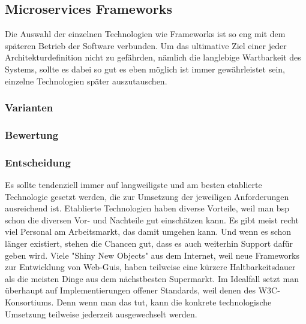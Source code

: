 \subsection{Microservices Frameworks}
\label{sec:frameworks}
Die Auswahl der einzelnen Technologien wie Frameworks ist so eng mit dem späteren Betrieb der Software verbunden.
Um das ultimative Ziel einer jeder Architekturdefinition nicht zu gefährden, nämlich die langlebige Wartbarkeit des Systems, sollte es dabei so gut es eben möglich ist immer gewährleistet sein, einzelne Technologien später auszutauschen.
\subsubsection{Varianten}
\label{sec:frameworks_varianten}


\subsubsection{Bewertung}
\label{sec:frameworks_bewertung}


\subsubsection{Entscheidung}
\label{sec:frameworks_entscheidung}

Es sollte tendenziell immer auf langweiligste und am besten etablierte Technologie gesetzt werden, die zur Umsetzung der jeweiligen Anforderungen ausreichend ist. Etablierte Technologien haben diverse Vorteile, weil man bsp schon die diversen Vor- und Nachteile gut einschätzen kann. Es gibt meist recht viel Personal am Arbeitsmarkt, das damit umgehen kann. Und wenn es schon länger existiert, stehen die Chancen gut, dass es auch weiterhin Support dafür geben wird. Viele "Shiny New Objects" aus dem Internet, weil neue Frameworks zur Entwicklung von Web-Guis, haben teilweise eine kürzere Haltbarkeitsdauer als die meisten Dinge aus dem nächstbesten Supermarkt. Im Idealfall setzt man überhaupt auf Implementierungen offener Standards, weil denen des W3C-Konsortiums. Denn wenn man das tut, kann die konkrete technologische Umsetzung teilweise jederzeit ausgewechselt werden.